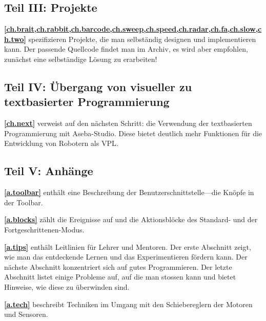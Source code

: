 \bigskip

\subsection*{Teil III: Projekte}

\textbf{\cref{ch.brait,ch.rabbit,ch.barcode,ch.sweep,ch.speed,ch.radar,ch.fa,ch.slow,ch.two}}
spezifizieren Projekte, die man selbständig designen und implementieren kann. Der passende Quellcode findet man im Archiv, es wird aber empfohlen, zunächst eine selbständige Lösung zu erarbeiten!

\bigskip

\subsection*{Teil IV: Übergang von visueller zu textbasierter Programmierung}

\textbf{\cref{ch.next}} verweist auf den nächsten Schritt: die Verwendung der textbasierten Programmierung mit Aseba-Studio. Diese bietet deutlich mehr Funktionen für die Entwicklung von Robotern als VPL.

\bigskip

\subsection*{Teil V: Anhänge}

\textbf{\cref{a.toolbar}} enthält eine Beschreibung der Benutzerschnittstelle---die Knöpfe in der Toolbar.

\textbf{\cref{a.blocks}} zählt die Ereignisse auf und die Aktionsblöcke des Standard- und der Fortgeschrittenen-Modus. 

\textbf{\cref{a.tips}} enthält Leitlinien für Lehrer und
Mentoren. Der erste Abschnitt zeigt, wie man das entdeckende Lernen und das Experimentieren fördern kann. Der nächste Abschnitt konzentriert sich auf gutes Programmieren. Der letzte Abschnitt listet einige Probleme auf, auf die man stossen kann und bietet Hinweise, wie diese zu überwinden sind.

\textbf{\cref{a.tech}} beschreibt Techniken im Umgang mit den Schiebereglern der Motoren und Sensoren.

 \quad {}



